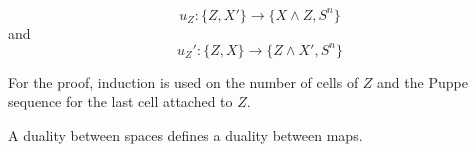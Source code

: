 $$u_Z: \{Z, X'\} \rightarrow \{X \wedge Z, S^n\}$$ and $$u_Z': \{Z, X\} \rightarrow \{Z \wedge X', S^n\}$$

For the proof, induction is used on the number of cells of $Z$ and the Puppe sequence for the last cell attached to $Z$.

A duality between spaces defines a duality between maps.
